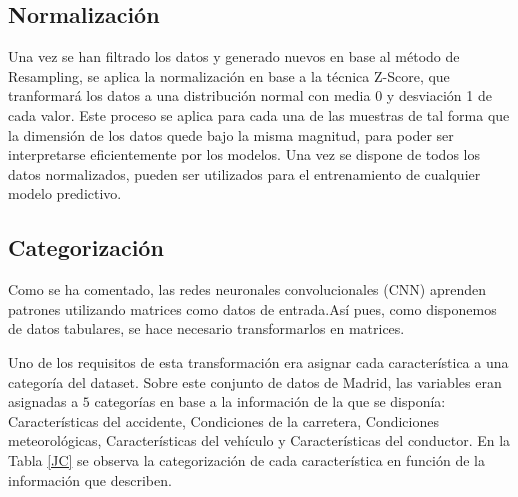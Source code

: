 \documentclass{uathesis-es}
\begin{document}
{\subsection*{Normalización}



Una vez se han filtrado los datos y generado nuevos en base al método de Resampling, se aplica la normalización en base a la técnica Z-Score, que tranformará los datos a una distribución normal con media 0 y desviación 1 de cada valor. Este proceso se aplica para cada una de las muestras de tal forma que la dimensión de los datos quede bajo la misma magnitud, para poder ser  interpretarse eficientemente por los modelos. Una vez se dispone de todos los datos normalizados, pueden ser utilizados para el entrenamiento de cualquier modelo predictivo.


\subsection*{Categorización}

Como se ha comentado, las redes neuronales convolucionales (CNN) aprenden patrones utilizando matrices como datos de entrada.Así pues, como disponemos de datos tabulares, se hace necesario transformarlos en matrices.

Uno de los requisitos de esta transformación era asignar cada característica a una categoría del dataset. Sobre este conjunto de datos de Madrid, las variables eran asignadas a $5$ categorías en base a la información de la que se disponía: Características del accidente, Condiciones de la carretera, Condiciones meteorológicas, Características del vehículo y Características del conductor. En la Tabla \ref{JC} se observa la categorización de cada característica en función de la información que describen.


}
\end{document}
